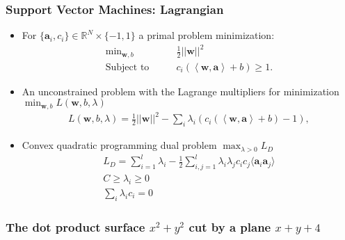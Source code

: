 \documentclass[proffesionalfonts]{beamer}
\begin{document}
\begin{frame}
\small
\frametitle{Support Vector Machines: Lagrangian}
\begin{itemize}
\item
For $\{\mathbf{a}_i, c_i\}\in\mathbb{R}^N\times\{-1, 1\}$ a primal problem minimization:
\setcounter{equation}{0}
\begin{align}
  \text{min}_{\mathbf{w}, b}&\qquad\frac 12||\mathbf{w}||^2\nonumber\\
\text{Subject to}&\qquad
c_i\left(\left\langle{\mathbf{w},\mathbf{a}}\right\rangle +
  b\right)\geq 1.\label{eq:1}
\end{align}
\item
An unconstrained problem with the Lagrange multipliers for minimization $\min_{\mathbf{w}, b} L(\mathbf{w}, b, \lambda)$
\begin{align}
  L(\mathbf{w}, b, \lambda) = \frac 12||\mathbf{w}||^2-\sum_i\lambda_i\left(c_i(\left\langle{\mathbf{w},\mathbf{a}}\right\rangle + b)-1\right),
\end{align}
  \item Convex quadratic programming dual problem $\max_{\lambda>0} L_D$
    \begin{align}
      L_D = \displaystyle\sum^l_{i=1} \lambda_i - \frac{1}{2}\displaystyle\sum_{i,j=1}^l \lambda_i \lambda_j c_i c_j \langle\mathbf a_i \mathbf a_j\rangle\\
	  C \geq \lambda_i \geq 0\\
	  \sum_{i} \lambda_{i}c_{i} =0 
    \end{align}
\end{itemize}
\end{frame}

\pgfplotsset{compat=1.12}
\begin{frame}
\frametitle{The dot product surface $x^2+y^2$ cut by a plane $x+y+4$}
\end{frame}
\end{document}
